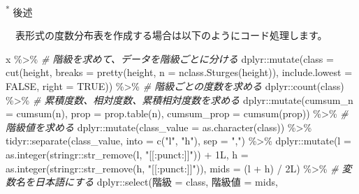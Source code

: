 \documentclass[
  12pt,
]{book}
\newenvironment{Shaded}{\begin{snugshade}}{\end{snugshade}}
\newcommand{\AttributeTok}[1]{\textcolor[rgb]{0.77,0.63,0.00}{#1}}
\newcommand{\CommentTok}[1]{\textcolor[rgb]{0.56,0.35,0.01}{\textit{#1}}}
\newcommand{\ConstantTok}[1]{\textcolor[rgb]{0.00,0.00,0.00}{#1}}
\newcommand{\FunctionTok}[1]{\textcolor[rgb]{0.00,0.00,0.00}{#1}}
\newcommand{\NormalTok}[1]{#1}
\newcommand{\OtherTok}[1]{\textcolor[rgb]{0.56,0.35,0.01}{#1}}
\newcommand{\SpecialCharTok}[1]{\textcolor[rgb]{0.00,0.00,0.00}{#1}}
\newcommand{\StringTok}[1]{\textcolor[rgb]{0.31,0.60,0.02}{#1}}
\begin{document}
\textsuperscript{*} 後述

　表形式の度数分布表を作成する場合は以下のようにコード処理します。

\begin{Shaded}
\begin{Highlighting}[]
\NormalTok{x }\SpecialCharTok{\%\textgreater{}\%} 
  \CommentTok{\# 階級を求めて、データを階級ごとに分ける}
\NormalTok{  dplyr}\SpecialCharTok{::}\FunctionTok{mutate}\NormalTok{(}\AttributeTok{class =} \FunctionTok{cut}\NormalTok{(height,}
                            \AttributeTok{breaks =} \FunctionTok{pretty}\NormalTok{(height, }\AttributeTok{n =} \FunctionTok{nclass.Sturges}\NormalTok{(height)),}
                            \AttributeTok{include.lowest =} \ConstantTok{FALSE}\NormalTok{, }\AttributeTok{right =} \ConstantTok{TRUE}\NormalTok{)) }\SpecialCharTok{\%\textgreater{}\%} 
  \CommentTok{\# 階級ごとの度数を求める}
\NormalTok{  dplyr}\SpecialCharTok{::}\FunctionTok{count}\NormalTok{(class) }\SpecialCharTok{\%\textgreater{}\%} 
  \CommentTok{\# 累積度数、相対度数、累積相対度数を求める}
\NormalTok{  dplyr}\SpecialCharTok{::}\FunctionTok{mutate}\NormalTok{(}\AttributeTok{cumsum\_n =} \FunctionTok{cumsum}\NormalTok{(n),}
                \AttributeTok{prop =} \FunctionTok{prop.table}\NormalTok{(n), }\AttributeTok{cumsum\_prop =} \FunctionTok{cumsum}\NormalTok{(prop)) }\SpecialCharTok{\%\textgreater{}\%} 
  \CommentTok{\# 階級値を求める}
\NormalTok{  dplyr}\SpecialCharTok{::}\FunctionTok{mutate}\NormalTok{(}\AttributeTok{class\_value =} \FunctionTok{as.character}\NormalTok{(class)) }\SpecialCharTok{\%\textgreater{}\%}
\NormalTok{  tidyr}\SpecialCharTok{::}\FunctionTok{separate}\NormalTok{(class\_value, }\AttributeTok{into =} \FunctionTok{c}\NormalTok{(}\StringTok{"l"}\NormalTok{, }\StringTok{"h"}\NormalTok{), }\AttributeTok{sep =} \StringTok{","}\NormalTok{) }\SpecialCharTok{\%\textgreater{}\%} 
\NormalTok{  dplyr}\SpecialCharTok{::}\FunctionTok{mutate}\NormalTok{(}\AttributeTok{l =} \FunctionTok{as.integer}\NormalTok{(stringr}\SpecialCharTok{::}\FunctionTok{str\_remove}\NormalTok{(l, }\StringTok{"[[:punct:]]"}\NormalTok{)) }\SpecialCharTok{+}\NormalTok{ 1L,}
                \AttributeTok{h =} \FunctionTok{as.integer}\NormalTok{(stringr}\SpecialCharTok{::}\FunctionTok{str\_remove}\NormalTok{(h, }\StringTok{"[[:punct:]]"}\NormalTok{)),}
                \AttributeTok{mids =}\NormalTok{ (l }\SpecialCharTok{+}\NormalTok{ h) }\SpecialCharTok{/}\NormalTok{ 2L) }\SpecialCharTok{\%\textgreater{}\%}
  \CommentTok{\# 変数名を日本語にする}
\NormalTok{  dplyr}\SpecialCharTok{::}\FunctionTok{select}\NormalTok{(}\StringTok{\textasciigrave{}}\AttributeTok{階級}\StringTok{\textasciigrave{}} \OtherTok{=}\NormalTok{ class, }\StringTok{\textasciigrave{}}\AttributeTok{階級値}\StringTok{\textasciigrave{}} \OtherTok{=}\NormalTok{ mids,}

\end{Highlighting}
\end{Shaded}
\end{document}
